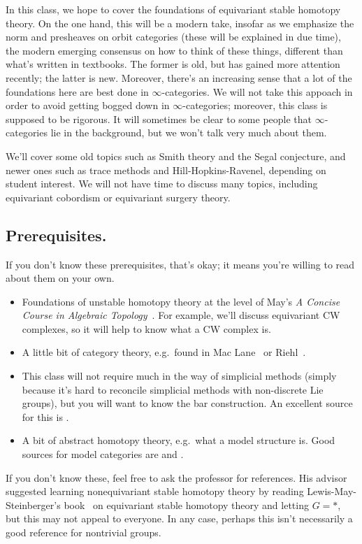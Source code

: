 In this class, we hope to cover the foundations of equivariant stable homotopy theory. On the one hand, this will
be a modern take, insofar as we emphasize the norm and presheaves on orbit categories (these will be explained in
due time), the modern emerging consensus on how to think of these things, different than what's written in
textbooks. The former is old, but has gained more attention recently; the latter is new. Moreover, there's an
increasing sense that a lot of the foundations here are best done in $\infty$-categories. We will not take this
appoach in order to avoid getting bogged down in $\infty$-categories; moreover, this class is supposed to be
rigorous. It will sometimes be clear to some people that $\infty$-categories lie in the background, but we won't
talk very much about them.

We'll cover some old topics such as Smith theory and the Segal conjecture, and newer ones such as trace methods
and Hill-Hopkins-Ravenel, depending on student interest. We will not have time to discuss many topics, including
equivariant cobordism or equivariant surgery theory.
\subsection*{Prerequisites.} If you don't know these prerequisites, that's okay; it means you're willing to read
about them on your own.
\begin{itemize}
	\item Foundations of unstable homotopy theory at the level of May's \textit{A Concise Course in Algebraic
	Topology}~\cite{ConciseCourse}. For example, we'll discuss equivariant CW complexes, so it will help to know
	what a CW complex is.
	\item A little bit of category theory, e.g.\ found in Mac Lane~\cite{MacLane} or Riehl~\cite{RiehlCTC}.
	\item This class will not require much in the way of simplicial methods (simply because it's hard to reconcile
	simplicial methods with non-discrete Lie groups), but you will want to know the bar construction. An excellent source for this is \cite[Chapter 4]{RiehlCHT}.
	\item A bit of abstract homotopy theory, e.g.\ what a model structure is. Good sources for model categories are \cite[Part III]{RiehlCHT} and \cite{Hovey}.
\end{itemize}
If you don't know these, feel free to ask the professor for references. His advisor suggested learning
nonequivariant stable homotopy theory by reading Lewis-May-Steinberger's book~\cite{LMS} on equivariant stable
homotopy theory and letting $G = *$, but this may not appeal to everyone. In any case, perhaps this isn't
necessarily a good reference for nontrivial groups.

